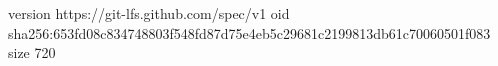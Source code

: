 version https://git-lfs.github.com/spec/v1
oid sha256:653fd08c834748803f548fd87d75e4eb5c29681c2199813db61c70060501f083
size 720
